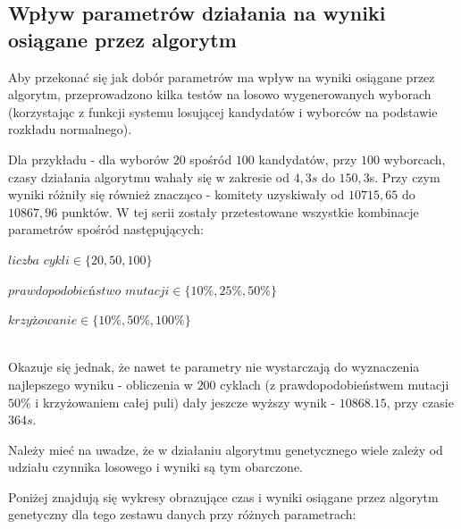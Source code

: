 \documentclass[pdflatex,11pt]{../aghdoc_version2}
\begin{document}
\subsection{Wpływ parametrów działania na wyniki osiągane przez algorytm}
Aby przekonać się jak dobór parametrów ma wpływ na wyniki osiągane przez algorytm, przeprowadzono kilka testów na losowo wygenerowanych wyborach (korzystając z funkcji systemu losującej kandydatów i wyborców na podstawie rozkładu normalnego).

Dla przykładu - dla wyborów $20$ spośród $100$ kandydatów, przy $100$ wyborcach, czasy działania algorytmu wahały się w zakresie od $4,3s$ do $150,3$s. Przy czym wyniki różniły się również znacząco - komitety uzyskiwały od $10715,65$ do $10867,96$ punktów. W tej serii zostały przetestowane wszystkie kombinacje parametrów spośród następujących:

$\textit{liczba cykli} \in \{ 20, 50, 100 \}$

$\textit{prawdopodobieństwo mutacji} \in \{ 10\%, 25\%, 50\% \}$

$\textit{krzyżowanie} \in \{ 10\%, 50\%, 100\% \}$

~\\ 
Okazuje się jednak, że nawet te parametry nie wystarczają do wyznaczenia najlepszego wyniku - obliczenia w $200$ cyklach (z prawdopodobieństwem mutacji $50\%$ i krzyżowaniem całej puli) dały jeszcze wyższy wynik - $10868.15$, przy czasie $364s$. 

Należy mieć na uwadze, że w działaniu algorytmu genetycznego wiele zależy od udziału czynnika losowego i wyniki są tym obarczone.

\newpage

Poniżej znajdują się wykresy obrazujące czas i wyniki osiągane przez algorytm genetyczny dla tego zestawu danych przy różnych parametrach:
\end{document}
